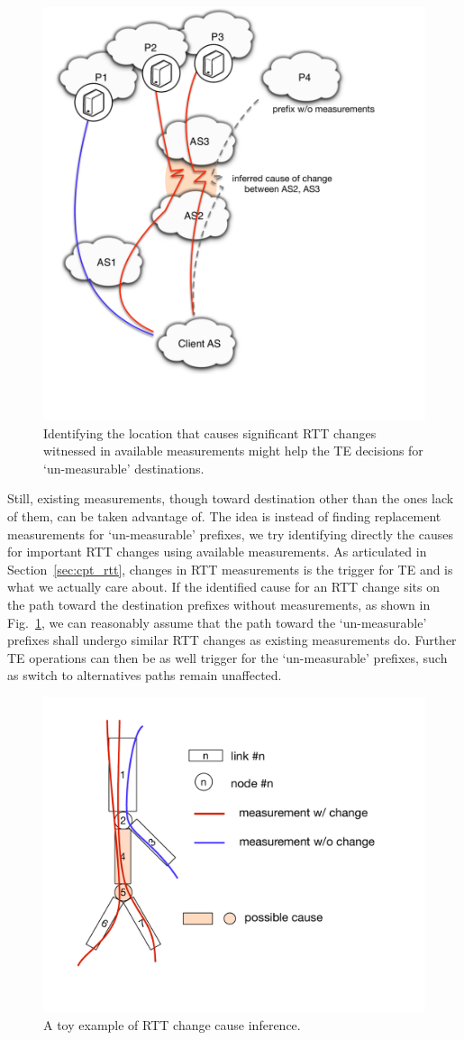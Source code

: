 \begin{figure}[!htb]
\centering
\includegraphics[width=.6\textwidth]{gfx/chap5/cause_infer_te.pdf}
\caption{Identifying the location that causes significant RTT changes witnessed in available measurements might help the TE decisions for `un-measurable' destinations.}
\label{fig:chap5_cause_infer_te}
\end{figure}

Still, existing measurements, though toward destination other than the ones lack of them, can be taken advantage of. The idea is instead of finding replacement measurements for `un-measurable' prefixes, we try identifying directly the causes for important RTT changes using available measurements. As articulated in Section~\ref{sec:cpt_rtt}, changes in RTT measurements is the trigger for TE and is what we actually care about. If the identified cause for an RTT change sits on the path toward the destination prefixes without measurements, as shown in Fig.~\ref{fig:chap5_cause_infer_te}, we can reasonably assume that the path toward the `un-measurable' prefixes shall undergo similar RTT changes as existing measurements do. Further TE operations can then be as well trigger for the `un-measurable' prefixes, such as switch to alternatives paths remain unaffected.

\begin{figure}[!htb]
\centering
\includegraphics[width=.75\textwidth]{gfx/chap5/toy_inference.pdf}
\caption{A toy example of RTT change cause inference.}
\label{fig:chap5_toy_inference}
\end{figure}

